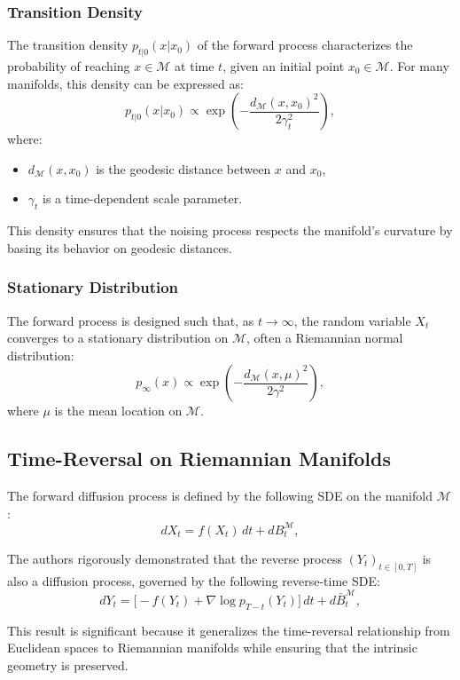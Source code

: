 \documentclass[a4paper,14pt]{article}
\theoremstyle{plain} %
\theoremstyle{definition} %
\theoremstyle{remark} %
\theoremstyle{definition}
\theoremstyle{remark}
\theoremstyle{remark}
\begin{document}
	\subsubsection{Transition Density}
	
	The transition density \( p_{t|0}(x | x_0) \) of the forward process characterizes the probability of reaching \( x \in \mathcal{M} \) at time \( t \), given an initial point \( x_0 \in \mathcal{M} \). For many manifolds, this density can be expressed as:
	\[
	p_{t|0}(x | x_0) \propto \exp\left(-\frac{d_\mathcal{M}(x, x_0)^2}{2\gamma_t^2}\right),
	\]
	where:
	\begin{itemize}
		\item \( d_\mathcal{M}(x, x_0) \) is the geodesic distance between \( x \) and \( x_0 \),
		\item \( \gamma_t \) is a time-dependent scale parameter.
	\end{itemize}
	
	This density ensures that the noising process respects the manifold's curvature by basing its behavior on geodesic distances.
	
	\subsubsection{Stationary Distribution}
	
	The forward process is designed such that, as \( t \to \infty \), the random variable \( X_t \) converges to a stationary distribution on \( \mathcal{M} \), often a Riemannian normal distribution:
	\[
	p_\infty(x) \propto \exp\left(-\frac{d_\mathcal{M}(x, \mu)^2}{2\gamma^2}\right),
	\]
	where \( \mu \) is the mean location on \( \mathcal{M} \).
	
	\subsection{Time-Reversal on Riemannian Manifolds}
	
	The forward diffusion process is defined by the following SDE on the manifold \( \mathcal{M} \):
	\[
	dX_t = f(X_t) \, dt +  dB_t^\mathcal{M},
	\]
	
	
	The authors rigorously demonstrated that the reverse process \( (Y_t)_{t \in [0, T]} \) is also a diffusion process, governed by the following reverse-time SDE:
	\[
	dY_t = \big[-f(Y_t) + \nabla \log p_{T-t}(Y_t) \big] \, dt +  d\bar{B}_t^\mathcal{M},
	\]
	
	This result is significant because it generalizes the time-reversal relationship from Euclidean spaces to Riemannian manifolds while ensuring that the intrinsic geometry is preserved.
	
\end{document}
